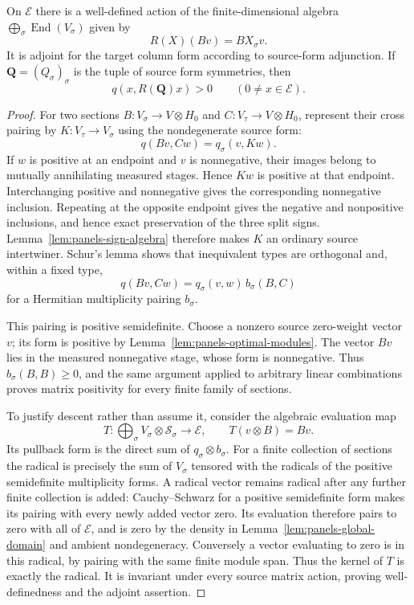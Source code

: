 \begin{proposition}\label{prop:panels-positive-action}
On $\mathcal E$ there is a well-defined action of the finite-dimensional
algebra $\bigoplus_\sigma\operatorname{End}(V_\sigma)$ given by
\[
 R(X)(Bv)=BX_\sigma v.
\]
It is adjoint for the target column form according to source-form
adjunction.  If $\mathbf Q=(Q_\sigma)_\sigma$ is the tuple of source
form symmetries, then
\begin{equation}\label{eq:input-12}
 q(x,R(\mathbf Q)x)>0\qquad(0\ne x\in\mathcal E).
\end{equation}
\end{proposition}

\begin{proof}
For two sections $B:V_\sigma\to V\otimes H_0$ and
$C:V_\tau\to V\otimes H_0$, represent their cross pairing by
$K:V_\tau\to V_\sigma$ using the nondegenerate source form:
\[
 q(Bv,Cw)=q_\sigma(v,Kw).
\]
If $w$ is positive at an endpoint and $v$ is nonnegative, their images
belong to mutually annihilating measured stages.  Hence $Kw$ is positive
at that endpoint.  Interchanging positive and nonnegative gives the
corresponding nonnegative inclusion.  Repeating at the opposite endpoint
gives the negative and nonpositive inclusions, and hence exact
preservation of the three split signs.  Lemma~\ref{lem:panels-sign-algebra}
therefore makes $K$ an ordinary source intertwiner.  Schur's lemma shows
that inequivalent types are orthogonal and, within a fixed type,
\[
 q(Bv,Cw)=q_\sigma(v,w)\,b_\sigma(B,C)
\]
for a Hermitian multiplicity pairing $b_\sigma$.

This pairing is positive semidefinite.  Choose a nonzero source
zero-weight vector $v$; its form is positive by
Lemma~\ref{lem:panels-optimal-modules}.  The vector $Bv$ lies in the
measured nonnegative stage, whose form is nonnegative.  Thus
$b_\sigma(B,B)\geq0$, and the same argument applied to arbitrary
linear combinations proves matrix positivity for every finite family of
sections.

To justify descent rather than assume it, consider the algebraic
evaluation map
\[
 T:\bigoplus_\sigma V_\sigma\otimes\mathscr S_\sigma
       \longrightarrow\mathcal E,
 \qquad T(v\otimes B)=Bv.
\]
Its pullback form is the direct sum of $q_\sigma\otimes b_\sigma$.
For a finite collection of sections the radical is precisely the sum of
$V_\sigma$ tensored with the radicals of the positive semidefinite
multiplicity forms.  A radical vector remains radical after any further
finite collection is added: Cauchy--Schwarz for a positive semidefinite
form makes its pairing with every newly added vector zero.  Its
evaluation therefore pairs to zero with all of $\mathcal E$, and is
zero by the density in Lemma~\ref{lem:panels-global-domain} and ambient
nondegeneracy.  Conversely a vector evaluating to zero is in this
radical, by pairing with the same finite module span.  Thus the kernel
of $T$ is exactly the radical.  It is invariant under every source
matrix action, proving well-definedness and the adjoint assertion.


\end{proof}
